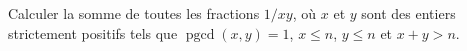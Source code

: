 Calculer la somme de toutes les fractions $1/xy$, où $x$ et $y$ sont des entiers strictement positifs tels que $\operatorname{pgcd}(x, y) = 1$, $x \leq n$, $y \leq n$ et $x + y > n$.
